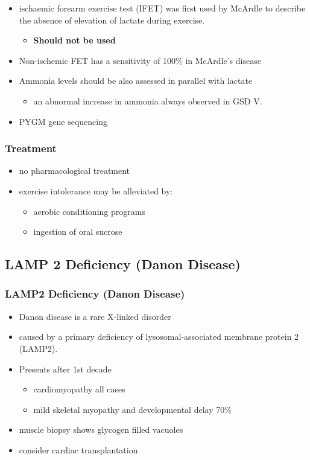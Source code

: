 \documentclass{scrartcl}
\begin{document}
\begin{itemize}
\item ischaemic forearm exercise test (IFET) was first used by McArdle to
describe the absence of elevation of lactate during exercise.
\begin{itemize}
\item \textbf{Should not be used}
\end{itemize}

\item Non-ischemic FET has a sensitivity of 100\% in McArdle’s disease
\item Ammonia levels should be also assessed in parallel with lactate
\begin{itemize}
\item an abnormal increase in ammonia always observed in GSD V.
\end{itemize}
\item PYGM gene sequencing
\end{itemize}

\subsubsection{Treatment}
\label{sec:orgfa4eb08}
\begin{itemize}
\item no pharmacological treatment
\item exercise intolerance may be alleviated by:
\begin{itemize}
\item aerobic conditioning programs
\item ingestion of oral sucrose
\end{itemize}
\end{itemize}
\subsection{LAMP 2 Deficiency (Danon Disease)}
\label{sec:orgce6e869}
\subsubsection{LAMP2 Deficiency (Danon Disease)}
\label{sec:org8c1c432}
\begin{itemize}
\item Danon disease is a rare X-linked disorder
\item caused by a primary deficiency of lysosomal-associated membrane
protein 2 (LAMP2).
\item Presents after 1st decade
\begin{itemize}
\item cardiomyopathy all cases
\item mild skeletal myopathy and developmental delay 70\%
\end{itemize}
\item muscle biopsy shows glycogen filled vacuoles
\item consider cardiac transplantation
\end{itemize}
\end{document}
